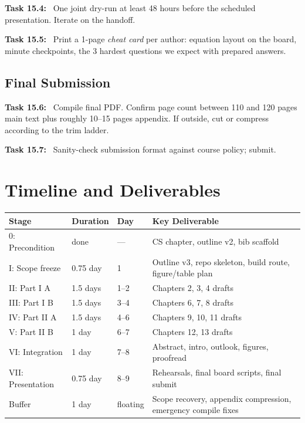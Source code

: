 \documentclass[11pt]{article}
\newcommand{\task}[1]{\medskip\noindent\textbf{Task #1:}\ }
\begin{document}
\task{15.4} One joint dry-run at least 48 hours before the scheduled presentation.
Iterate on the handoff.

\task{15.5} Print a 1-page \emph{cheat card} per author: equation layout on the board,
minute checkpoints, the 3 hardest questions we expect with prepared answers.

\subsection{Final Submission}

\task{15.6} Compile final PDF. Confirm page count between 110 and 120 pages main text
plus roughly 10--15 pages appendix. If outside, cut or compress according to the trim ladder.

\task{15.7} Sanity-check submission format against course policy; submit.

\section{Timeline and Deliverables}\label{sec:timeline}

\begin{center}\small
\begin{tabular}{@{}lllp{6cm}@{}}
\toprule
\textbf{Stage} & \textbf{Duration} & \textbf{Day} & \textbf{Key Deliverable} \\
\midrule
0: Precondition & done & --- & CS chapter, outline v2, bib scaffold \\
I: Scope freeze & 0.75 day & 1 & Outline v3, repo skeleton, build route, figure/table plan \\
II: Part I A & 1.5 days & 1--2 & Chapters 2, 3, 4 drafts \\
III: Part I B & 1.5 days & 3--4 & Chapters 6, 7, 8 drafts \\
IV: Part II A & 1.5 days & 4--6 & Chapters 9, 10, 11 drafts \\
V: Part II B & 1 day & 6--7 & Chapters 12, 13 drafts \\
VI: Integration & 1 day & 7--8 & Abstract, intro, outlook, figures, proofread \\
VII: Presentation & 0.75 day & 8--9 & Rehearsals, final board scripts, final submit \\
Buffer & 1 day & floating & Scope recovery, appendix compression, emergency compile fixes \\
\bottomrule
\end{tabular}
\end{center}
\smallskip
\end{document}
